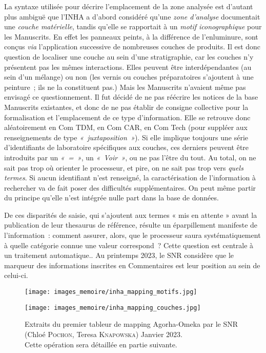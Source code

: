 \documentclass[a4paper,12pt, twoside]{book}
\begin{document}
La syntaxe utilisée pour décrire l’emplacement de la zone analysée est d’autant plus ambiguë que l’INHA a d’abord considéré qu’une \textit{zone d’analyse} documentait une \textit{couche matérielle}, tandis qu’elle se rapportait à un \textit{motif iconographique} pour les Manuscrits. En effet les panneaux peints, à la différence de l’enluminure, sont conçus \textit{via} l’application successive de nombreuses couches de produits. Il est donc question de localiser une couche au sein d’une stratigraphie, car les couches n’y présentent pas les mêmes interactions. Elles peuvent être interdépendantes (au sein d’un mélange) ou non (les vernis ou couches préparatoires s’ajoutent à une peinture~; ils ne la constituent pas.) Mais les Manuscrits n’avaient même pas envisagé ce questionnement. Il fut décidé de ne pas réécrire les notices de la base Manuscrits existantes, et donc de ne pas établir de consigne collective pour la formalisation et l’emplacement de ce type d’information. Elle se retrouve donc aléatoirement en \textsf{Com TDM}, en \textsf{Com CAR}, en \textsf{Com Tech} (pour suppléer aux renseignements de type \textit{«~juxtaposition~»}). Si elle implique toujours une série d’identifiants de laboratoire spécifiques aux couches, ces derniers peuvent être introduits par un \textit{«~=~»}, un \textit{«~Voir~»}, ou ne pas l’être du tout. Au total, on ne sait pas trop où orienter le processeur, et pire, on ne sait pas trop vers \textit{quels termes}. Si aucun identifiant n’est renseigné, la caractérisation de l’information à rechercher va de fait poser des difficultés supplémentaires. On peut même partir du principe qu’elle n’est intégrée nulle part dans la base de données.

De ces disparités de saisie, qui s’ajoutent aux termes « mis en attente » avant la publication de leur thesaurus de référence, résulte un éparpillement manifeste de l’information~: comment assurer, alors, que le processeur saura systématiquement à quelle catégorie connue une valeur correspond~? Cette question est centrale à un traitement automatique.. Au printemps 2023, le SNR considère que le marqueur des informations inscrites en \textsf{Commentaires} est leur position au sein de celui-ci.

\begin{figure}[ht]
    \centering
        \texttt{[image: images\_memoire/inha\_mapping\_motifs.jpg]} 
        
   \smallskip
   
        \texttt{[image: images\_memoire/inha\_mapping\_couches.jpg]}

    \caption*{Extraits du premier tableur de mapping Agorha-Omeka par le SNR (Chloé \textsc{Pochon}, Teresa \textsc{Knapowska}) Janvier 2023.\\
Cette opération sera détaillée en partie suivante.}
\label{fig:image2}
\end{figure}
\end{document}
